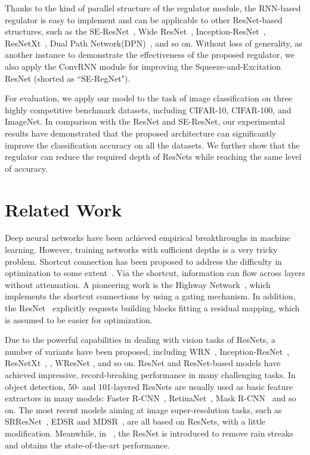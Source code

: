 \documentclass[journal,comsoc]{IEEEtran}
\begin{document}
Thanks to the kind of parallel structure of the regulator module, the RNN-based regulator is easy to implement and can be applicable to other ResNet-based structures, such as the SE-ResNet~\cite{DBLP:journals/corr/abs-1709-01507}, Wide ResNet~\cite{DBLP:journals/corr/ZagoruykoK16},  Inception-ResNet~\cite{DBLP:journals/corr/SzegedyIV16}, ResNetXt~\cite{DBLP:journals/corr/XieGDTH16}, Dual Path Network(DPN)~\cite{DBLP:journals/corr/ChenLXJYF17}, and so on. Without loss of generality, as another instance to demonstrate the effectiveness of the proposed regulator, we also apply the ConvRNN module for improving the Squeeze-and-Excitation ResNet (shorted as ``SE-RegNet"). 


For evaluation, we apply our model to the task of image classification on three highly competitive benchmark datasets, including CIFAR-10, CIFAR-100, and ImageNet. In comparison with the ResNet and SE-ResNet, our experimental results have demonstrated that the proposed architecture can significantly improve the classification accuracy on all the datasets. We further show that the regulator can reduce the required depth of ResNets while reaching the same level of accuracy. 
 

\section{Related Work}


Deep neural networks have been achieved empirical breakthroughs in machine learning. However, training networks with sufficient depths is a very tricky problem. 
Shortcut connection has been proposed to address the difficulty in optimization to some extent~\cite{DBLP:journals/corr/SrivastavaGS15,DBLP:journals/corr/HeZRS15}. Via the shortcut, information can flow across layers without attenuation. A pioneering work is the Highway Network~\cite{DBLP:journals/corr/SrivastavaGS15}, which implements the shortcut connections by using a gating mechanism. In addition, the ResNet~\cite{DBLP:journals/corr/HeZRS15} explicitly requests building blocks fitting a residual mapping, which is assumed to be easier for optimization. 


Due to the powerful capabilities in dealing with vision tasks of ResNets, a number of variants have been proposed, 
including WRN~\cite{DBLP:journals/corr/ZagoruykoK16}, 
Inception-ResNet~\cite{DBLP:journals/corr/SzegedyIV16}, 
ResNetXt~\cite{DBLP:journals/corr/XieGDTH16}, 
, WResNet \cite{shen2016weighted}, 
and so on. ResNet and ResNet-based models have achieved impressive, record-breaking performance in many challenging tasks.
In object detection, 50- and 101-layered ResNets are usually used as basic feature extractors in many models: Faster R-CNN~\cite{DBLP:journals/corr/RenHG015}, RetinaNet~\cite{DBLP:journals/corr/abs-1708-02002}, Mask R-CNN~\cite{DBLP:journals/corr/HeGDG17} and so on. 
The most recent models aiming at image super-resolution tasks, such as SRResNet~\cite{DBLP:journals/corr/LedigTHCATTWS16}, EDSR and MDSR~\cite{Lim_2017_CVPR_Workshops}, are all based on ResNets, with a little modification. Meanwhile, in ~\cite{DBLP:conf/cvpr/FuHZHDP17}, the ResNet is introduced to remove rain streaks and obtains the state-of-the-art performance.
\end{document}
